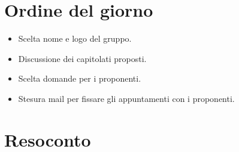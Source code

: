 \section{Ordine del giorno}

\begin{itemize}
    \item Scelta nome e logo del gruppo.
    \item Discussione dei capitolati proposti.
    \item Scelta domande per i proponenti.
    \item Stesura mail per fissare gli appuntamenti con i proponenti.
\end{itemize}

\section{Resoconto}

